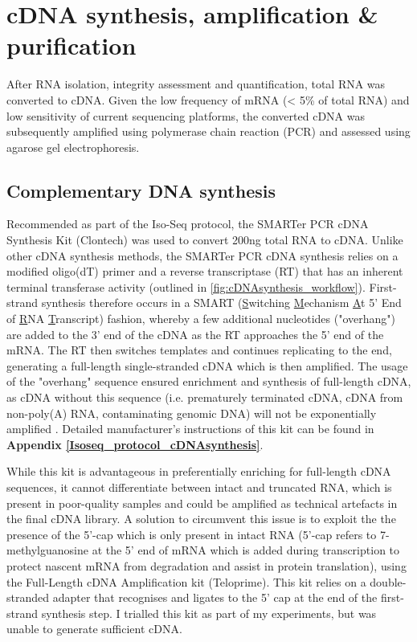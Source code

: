\begin{figure}[htp]
	\label{fig:bionalayzer_pics}
\end{figure}

\newpage
\section{cDNA synthesis, amplification \& purification}
After RNA isolation, integrity assessment and quantification, total RNA was converted to cDNA. Given the low frequency of mRNA (< 5\% of total RNA) and low sensitivity of current sequencing platforms, the converted cDNA was subsequently amplified using polymerase chain reaction (PCR) and assessed using agarose gel electrophoresis. 


\subsection{Complementary DNA synthesis}
\label{section:ch2_cDNA_synthesis_explanation} 
Recommended as part of the Iso-Seq protocol, the SMARTer PCR cDNA Synthesis Kit (Clontech) was used to convert 200ng total RNA to cDNA. Unlike other cDNA synthesis methods, the SMARTer PCR cDNA synthesis relies on a modified oligo(dT) primer and a reverse transcriptase (RT) that has an inherent terminal transferase activity (outlined in \cref{fig:cDNAsynthesis_workflow}). First-strand synthesis therefore occurs in a SMART (\underline{S}witching \underline{M}echanism \underline{A}t 5' End of \underline{R}NA \underline{T}ranscript) fashion, whereby a few additional nucleotides ("overhang") are added to the 3' end of the cDNA as the RT approaches the 5' end of the mRNA. The RT then switches templates and continues replicating to the end, generating a full-length single-stranded cDNA which is then amplified. The usage of the "overhang" sequence ensured enrichment and synthesis of full-length cDNA, as cDNA without this sequence (i.e. prematurely terminated cDNA, cDNA from non-poly(A) RNA, contaminating genomic DNA) will not be exponentially amplified \cite{Ramskold2012}. Detailed manufacturer's instructions of this kit can be found in \textbf{Appendix \ref{Isoseq_protocol_cDNAsynthesis}}. 

While this kit is advantageous in preferentially enriching for full-length cDNA sequences, it cannot differentiate between intact and truncated RNA, which is present in poor-quality samples and could be amplified as technical artefacts in the final cDNA library. A solution to circumvent this issue is to exploit the the presence of the 5’-cap which is only present in intact RNA (5'-cap refers to 7-methylguanosine at the 5’ end of mRNA which is added during transcription to protect nascent mRNA from degradation and assist in protein translation), using the Full-Length cDNA Amplification kit (Teloprime)\cite{Cartolano2016}. This kit relies on a double-stranded adapter that recognises and ligates to the 5’ cap at the end of the first-strand synthesis step. I trialled this kit as part of my experiments, but was unable to generate sufficient cDNA. 

